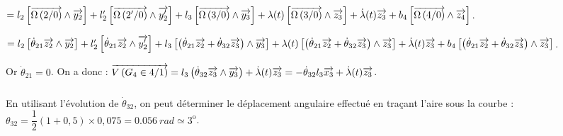 \documentclass[10pt,fleqn]{article} %
\begin{document}
$= 
l_2\left[ \overrightarrow{\Omega\left( {2}/{0}\right)} \wedge \overrightarrow{y_2} \right]+
l_2'\left[ \overrightarrow{\Omega\left( {2'}/{0}\right)} \wedge \overrightarrow{y_2'} \right]+
l_3\left[ \overrightarrow{\Omega\left( {3}/{0}\right)} \wedge \overrightarrow{y_3} \right]+
\lambda(t)\left[ \overrightarrow{\Omega\left( {3}/{0}\right)} \wedge \overrightarrow{z_3} \right]+
\dot{\lambda}(t)\overrightarrow{z_3}+
b_4\left[ \overrightarrow{\Omega\left( {4}/{0}\right)} \wedge \overrightarrow{z_4} \right]$. 

$= 
l_2\left[ \dot{\theta}_{21}\overrightarrow{z_2} \wedge \overrightarrow{y_2} \right]+
l_2'\left[ \dot{\theta}_{21}\overrightarrow{z_2} \wedge \overrightarrow{y_2'} \right]+
l_3\left[ \left(\dot{\theta}_{21}\overrightarrow{z_2}+\dot{\theta}_{32}\overrightarrow{z_3} \right) \wedge \overrightarrow{y_3} \right]+
\lambda(t)\left[ \left(\dot{\theta}_{21}\overrightarrow{z_2}+\dot{\theta}_{32}\overrightarrow{z_3} \right) \wedge \overrightarrow{z_3} \right]+
\dot{\lambda}(t)\overrightarrow{z_3}+
b_4\left[ \left(\dot{\theta}_{21}\overrightarrow{z_2}+\dot{\theta}_{32}\overrightarrow{z_3} \right) \wedge \overrightarrow{z_3} \right]$. 

Or $\dot{\theta}_{21}=0$. On a donc :
$\overrightarrow{V\left( {G_4} \in {4}/{1}\right)}= 
l_3\left(\dot{\theta}_{32}\overrightarrow{z_3} \wedge \overrightarrow{y_3} \right)+
\dot{\lambda}(t)\overrightarrow{z_3} =
-\dot{\theta}_{32}l_3\overrightarrow{x_3}  + \dot{\lambda}(t)\overrightarrow{z_3}$.

%
%
%
%
%
%



\subparagraph{}%
En utilisant l'évolution de $\dot{\theta}_{32}$, on peut déterminer le déplacement angulaire effectué en traçant l'aire sous la courbe :
$\theta_{32}=\dfrac{1}{2}\left( 1+0,5\right)\times 0,075 =\SI{0,056}{rad}\simeq 3^{\text{o}}$.
\end{document}
